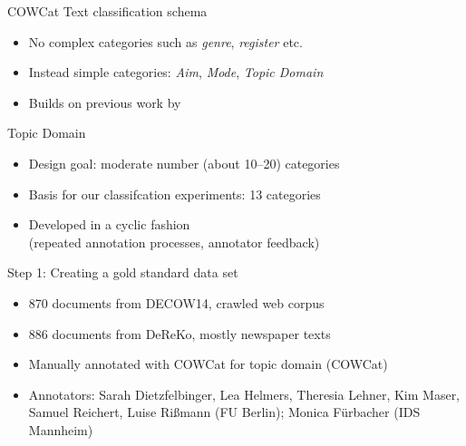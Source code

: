 \documentclass{beamer}
\begin{document}
\begin{frame}
  {COWCat}
  Text classification schema  \citep{SchaeferBildhauer2012a}\\

  \begin{itemize}
    \item No complex categories such as \textit{genre}, \textit{register} etc.
    \item Instead simple categories: \textit{Aim}, \textit{Mode}, \alert{\textit{Topic Domain}}
    \item Builds on previous work by \citet{Sharoff2006}
    \end{itemize}

\pause
    Topic Domain\\

    \begin{itemize}
    \item Design goal: moderate number (about 10--20) categories
    \item Basis for our classifcation experiments: 13 categories
    \item Developed in a cyclic fashion\\
    (repeated annotation processes, annotator feedback)
  \end{itemize}
\end{frame}

\begin{frame}
  {Step 1: Creating a gold standard data set}
  \begin{itemize}
    \item 870 documents from \alert{DECOW14}, crawled \alert{web} corpus\\
    \citep{SchaeferBildhauer2012a,Schaefer2015b}
    \item 886 documents from \alert{DeReKo}, mostly \alert{newspaper} texts\\
    \citep{KupietzEa2010}
    \item Manually annotated with COWCat for topic domain (COWCat)
      \vspace{0.5cm}
    \item {\footnotesize Annotators: Sarah Dietzfelbinger, Lea Helmers, Theresia Lehner, Kim Maser, Samuel Reichert, Luise Rißmann (FU Berlin); Monica Fürbacher (IDS Mannheim)}
  \end{itemize}
\end{frame}
\end{document}
